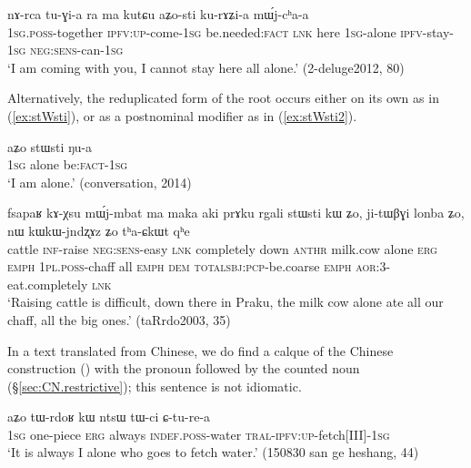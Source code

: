 \begin{exe}
	\ex \label{ex:aZosti}
	\gll   nɤ-rca tu-ɣi-a ra ma kutɕu aʑo-sti ku-rɤʑi-a mɯ́j-cʰa-a \\
	\textsc{1sg}.\textsc{poss}-together \textsc{ipfv}:\textsc{up}-come-\textsc{1sg} be.needed:\textsc{fact} \textsc{lnk} here \textsc{1sg}-alone \textsc{ipfv}-stay-\textsc{1sg} \textsc{neg}:\textsc{sens}-can-\textsc{1sg} \\
	\glt `I am coming with you, I cannot stay here all alone.' (2-deluge2012, 80)
\end{exe}

Alternatively, the reduplicated form of the root  occurs either on its own as in (\ref{ex:stWsti}), or as a postnominal modifier as in (\ref{ex:stWsti2}).

\begin{exe}
	\ex \label{ex:stWsti}
	\gll aʑo stɯsti ŋu-a \\
	\textsc{1sg} alone be:\textsc{fact}-\textsc{1sg} \\
	\glt `I am alone.' (conversation, 2014)
\end{exe}

\begin{exe}
	\ex \label{ex:stWsti2}
	\gll  fsapaʁ kɤ-χsu mɯ́j-mbat ma maka aki prɤku rgali stɯsti kɯ ʑo, ji-tɯβɣi lonba ʑo, nɯ kɯ\redp{}kɯ-jndʐɤz ʑo tʰa-ɕkɯt qʰe \\
	cattle \textsc{inf}-raise \textsc{neg}:\textsc{sens}-easy \textsc{lnk} completely down  \textsc{anthr} milk.cow alone \textsc{erg} \textsc{emph} \textsc{1pl}.\textsc{poss}-chaff all \textsc{emph} \textsc{dem} \textsc{total}\redp{}\textsc{sbj}:\textsc{pcp}-be.coarse \textsc{emph} \textsc{aor}:3\flobv{}-eat.completely \textsc{lnk} \\
	\glt `Raising cattle is difficult, down there in Praku, the milk cow alone ate all our chaff, all the big ones.' (taRrdo2003, 35)
\end{exe}


In a text translated from Chinese, we do find a calque of the Chinese construction () with the pronoun  followed by the counted noun  (§\ref{sec:CN.restrictive}); this sentence is not idiomatic.

\begin{exe}
	\ex \label{ex:aZo.tWrdoR}
	\gll  aʑo tɯ-rdoʁ kɯ ntsɯ tɯ-ci ɕ-tu-re-a \\
	\textsc{1sg} one-piece \textsc{erg} always \textsc{indef}.\textsc{poss}-water \textsc{tral}-\textsc{ipfv}:\textsc{up}-fetch[III]-\textsc{1sg} \\
	\glt `It is always I alone who goes to fetch water.' (150830 san ge heshang, 44)
\end{exe}

